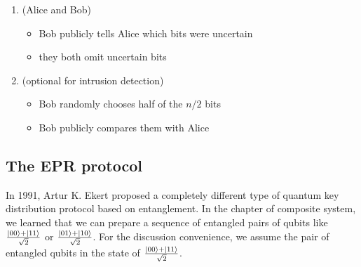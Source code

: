 \documentclass{easyclass}
\begin{document}
\begin{enumerate}
	\item (Alice and Bob)
		\begin{itemize}
			\item Bob publicly tells Alice which bits were uncertain 
			\item they both omit uncertain bits
		\end{itemize}
	
	\item (optional for intrusion detection)	
		\begin{itemize}
			\item Bob randomly chooses half of the $n/2$ bits
			\item Bob publicly compares them with Alice
		\end{itemize}
\end{enumerate}


\subsection{The EPR protocol}
In 1991, Artur K. Ekert proposed a completely different type of quantum key distribution protocol based on entanglement. In the chapter of composite system, we learned that we can prepare a sequence of entangled pairs of qubits like $\frac{\ket{00}+\ket{11}}{\sqrt{2}}$ or $\frac{\ket{01}+\ket{10}}{\sqrt{2}}$. For the discussion convenience, we assume the pair of entangled qubits in the state of $\frac{\ket{00}+\ket{11}}{\sqrt{2}}$.
\end{document}
